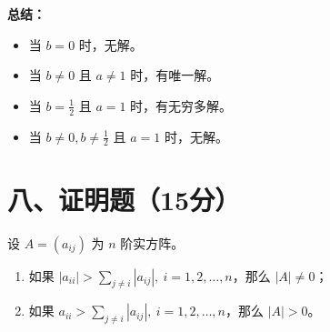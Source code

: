 \documentclass[lang=cn,12pt]{elegantbook}
\begin{document}
\begin{solution}
\textbf{总结：}
\begin{itemize}
    \item 当 $b = 0$ 时，无解。
    \item 当 $b \neq 0$ 且 $a \neq 1$ 时，有唯一解。
    \item 当 $b = \frac{1}{2}$ 且 $a = 1$ 时，有无穷多解。
    \item 当 $b \neq 0, b \neq \frac{1}{2}$ 且 $a = 1$ 时，无解。
\end{itemize}
\end{solution}

\section*{八、证明题（15分）}

\begin{example}
设 $A = (a_{ij})$ 为 $n$ 阶实方阵。
\begin{enumerate}
    \item 如果 $|a_{ii}| > \sum_{j\neq i} |a_{ij}|, \ i = 1, 2, \ldots, n$，那么 $|A| \neq 0$；
    \item 如果 $a_{ii} > \sum_{j\neq i} |a_{ij}|, \ i = 1, 2, \ldots, n$，那么 $|A| > 0$。
\end{enumerate}
\end{example}
\end{document}
